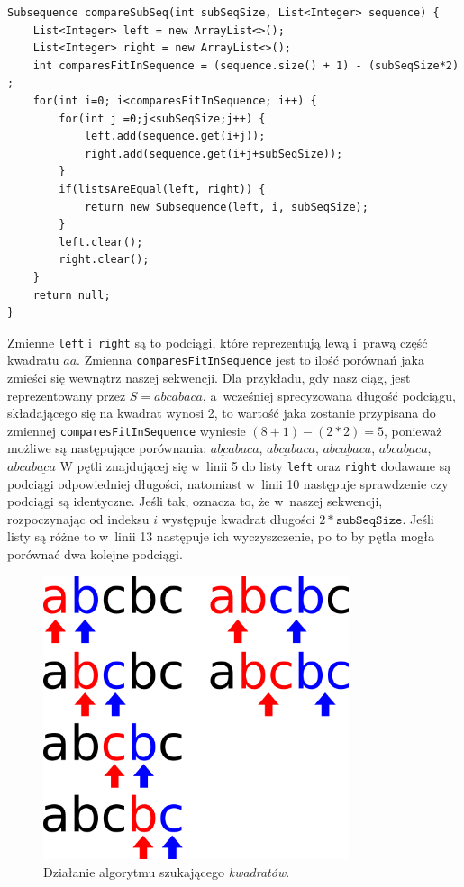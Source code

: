 \documentclass[document]{xmgr}
\begin{document}
\begin{lstlisting}[frame=single]
Subsequence compareSubSeq(int subSeqSize, List<Integer> sequence) {
	List<Integer> left = new ArrayList<>();
	List<Integer> right = new ArrayList<>();
	int comparesFitInSequence = (sequence.size() + 1) - (subSeqSize*2) ;
	for(int i=0; i<comparesFitInSequence; i++) {
		for(int j =0;j<subSeqSize;j++) {
			left.add(sequence.get(i+j));
			right.add(sequence.get(i+j+subSeqSize));
		}
		if(listsAreEqual(left, right)) {
			return new Subsequence(left, i, subSeqSize);
		}
		left.clear();
		right.clear();
	}
	return null;
}
\end{lstlisting}
Zmienne \texttt{left} i~\texttt{right} są to podciągi, które reprezentują lewą i~prawą część kwadratu $aa$. Zmienna \texttt{comparesFitInSequence} jest to ilość porównań jaka zmieści się wewnątrz naszej sekwencji. Dla przykładu, gdy nasz ciąg, jest reprezentowany przez $S = abcabaca$, a~wcześniej sprecyzowana długość podciągu, składającego się na kwadrat wynosi 2, to wartość jaka zostanie przypisana do zmiennej \mbox{\texttt{comparesFitInSequence}} wyniesie $(8 + 1) - (2 * 2)=5$, ponieważ możliwe są następujące porównania: $\underline{abca}baca$, $a\underline{bcab}aca$, $ab\underline{caba}ca$, $abc\underline{abac}a$, $abca\underline{baca}$
W pętli znajdującej się w~linii 5 do listy \texttt{left} oraz \mbox{\texttt{right}} dodawane są podciągi odpowiedniej długości, natomiast w~linii 10 następuje sprawdzenie czy podciągi są identyczne. Jeśli tak, oznacza to, że w~naszej sekwencji, rozpoczynając od indeksu $i$ występuje kwadrat długości $2 * \texttt{subSeqSize}$. Jeśli listy są różne to w~linii 13 następuje ich wyczyszczenie, po to by pętla mogła porównać dwa kolejne podciągi.

\begin{figure}[b]
    \centering
    \includegraphics[width = 0.8\textwidth]{images/squareFinding}
    \caption{Działanie algorytmu szukającego \emph{kwadratów}.}
    \label{fig:squareFinding}
\end{figure}
\end{document}
